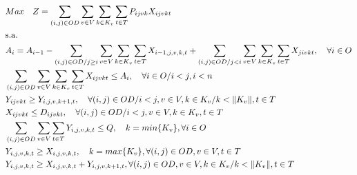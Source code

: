 \begin{align}
	& Max \quad Z = \sum_{(i,j)\in OD} \sum_{v\in V} \sum_{k\in K_v} \sum_{t\in T} P_{ijvk} X_{ijvkt}                                                                                                                \label{eq: m1_fo}                          \\
	& \text{s.a.}  \notag                                                                                                                                                                                                                                       \\
	& A_{i} = A_{i-1} - \sum_{(i,j) \in OD/j \geq i} \sum_{v\in V} \sum_{k\in K_v}\sum_{t\in T}X_{i-1,j,v,k,t} + \sum_{(i,j) \in OD/j<i}\sum_{v\in V} \sum_{k\in K_v}\sum_{t\in T}X_{jivkt}, \quad \forall i \in O  \label{eq: m1_disponi}                     \\
	& \sum_{(i,j) \in OD}\sum_{v\in V} \sum_{k\in K_v}\sum_{t\in T} X_{ijvkt} \leq A_{i} , \quad \forall i \in O /i<j, i < n                                                                                        \label{eq: m1_cap_assig}                   \\
	& Y_{ijvkt} \geq Y_{i,j,v,k+1,t},  \quad \forall (i,j) \in OD / i < j, v \in V, k \in K_v / k < \lVert K_v \rVert , t \in T                                                                                                                     \label{eq: m1_jerar_class}                 \\   %
	& X_{ijvkt} \leq D_{ijvkt},  \quad \forall (i,j) \in OD / i < j  ,v \in V, k \in K_v, t\in T                                                                                                                                                  \label{eq: m1_assig_menor_dem}             \\
	& \sum_{(i,j) \in OD}\sum_{v\in V}\sum_{t\in T} Y_{i,j,v,k,t} \leq Q, \quad  k = min\{K_v\}, \forall i \in O                                                                                                  \label{eq: m1_cap_autho_1er_class}         \\
	& Y_{i,j,v,k,t} \geq  X_{i,j,v,k,t},  \quad k = max\{K_v\}, \forall(i,j) \in OD ,v \in V, t \in T                                                                                                                                     \label{eq: m1_autho_mayor_assig_1er_class} \\
	& Y_{i,j,v,k,t} \geq  X_{i,j,v,k,t} + Y_{i,j,v,k + 1,t} , \forall(i,j) \in OD, v \in V, k \in K_v / k < \lVert K_v \rVert , t \in T                                                                                                            \label{eq: m1_autho_mayor_assig_mas_autho} \\

\end{align}

